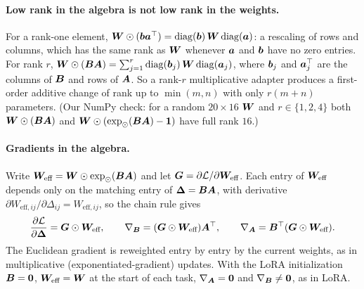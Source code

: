 \paragraph{Low rank in the algebra is not low rank in the weights.} For a rank-one element,
$\bm{W}\odot(\bm{b}\bm{a}^{\top}) = \operatorname{diag}(\bm{b})\,\bm{W}\operatorname{diag}(\bm{a})$: a rescaling of rows and columns, which has the
same rank as $\bm{W}$ whenever $\bm{a}$ and $\bm{b}$ have no zero entries. For rank $r$, $\bm{W}\odot(\bm{B}\bm{A}) = \sum_{j=1}^r\operatorname{diag}(\bm{b}_j)\,\bm{W}\operatorname{diag}(\bm{a}_j)$, where
$\bm{b}_j$ and $\bm{a}_j^{\top}$ are the columns of $\bm{B}$ and rows of $\bm{A}$. So a rank-$r$ multiplicative
adapter produces a first-order additive change of rank up to $\min(m,n)$ with only $r(m+n)$
parameters. (Our NumPy check: for a random $20\times16$ $\bm{W}$ and $r \in \{1,2,4\}$ both
$\bm{W}\odot(\bm{B}\bm{A})$ and $\bm{W}\odot(\exp_{\odot}(\bm{B}\bm{A}) - \bm{1})$ have full rank $16$.)

\paragraph{Gradients in the algebra.} Write $\bm{W}_{\text{eff}} = \bm{W}\odot\exp_{\odot}(\bm{B}\bm{A})$ and let
$\bm{G} = \partial\mathcal{L}/\partial\bm{W}_{\text{eff}}$. Each entry of $\bm{W}_{\text{eff}}$ depends only on the
matching entry of $\bm{\Delta} = \bm{B}\bm{A}$, with derivative
$\partial W_{\text{eff},ij}/\partial\Delta_{ij} = W_{\text{eff},ij}$, so the chain rule gives
\begin{equation}
  \frac{\partial\mathcal{L}}{\partial\bm{\Delta}} = \bm{G}\odot\bm{W}_{\text{eff}}, \qquad
  \nabla_{\bm{B}} = (\bm{G}\odot\bm{W}_{\text{eff}})\bm{A}^{\top}, \qquad
  \nabla_{\bm{A}} = \bm{B}^{\top}(\bm{G}\odot\bm{W}_{\text{eff}}).
  \label{eq:c11-olie-grad}
\end{equation}
The Euclidean gradient is reweighted entry by entry by the current weights, as in multiplicative
(exponentiated-gradient) updates. With the LoRA initialization $\bm{B} = \bm{0}$, $\bm{W}_{\text{eff}} =
\bm{W}$ at the start of each task, $\nabla_{\bm{A}} = \bm{0}$ and $\nabla_{\bm{B}} \neq \bm{0}$, as in LoRA.

